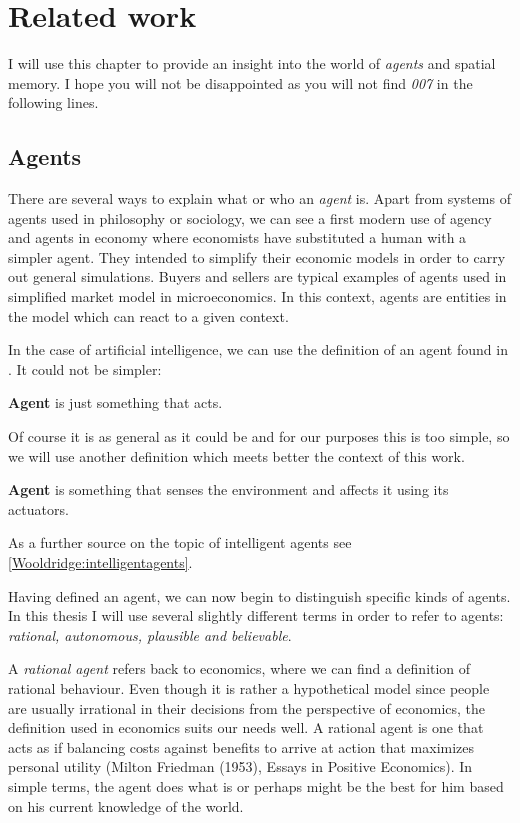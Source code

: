 \chapter{Related work}

I will use this chapter to provide an insight into the world of \emph{agents} and spatial memory. I hope you will not be disappointed as you will not find \textit{007} in the following lines.

\section{Agents}

There are several ways to explain what or who an \emph{agent} is. Apart from systems of agents used in philosophy or sociology, we can see a first modern use of agency and agents in economy where economists have substituted a human with a simpler agent. They intended to simplify their economic models in order to carry out general simulations. Buyers and sellers are typical examples of agents used in simplified market model in microeconomics. In this context, agents are entities in the model which can react to a given context.

In the case of artificial intelligence, we can use the definition of an agent found in \cite{russel2003ai}. It could not be simpler:

\begin{definition}{\bf Agent} is just something that acts.
\end{definition} 

Of course it is as general as it could be and for our purposes this is too simple, so we will use another definition which meets better the context of this work.

\begin{definition}{\bf Agent} is something that senses the environment and affects it using its actuators.
\end{definition} 

As a further source on the topic of intelligent agents see \ref{Wooldridge:intelligentagents}.

Having defined an agent, we can now begin to distinguish specific kinds of agents. In this thesis I will use several slightly different terms in order to refer to agents: \emph{rational, autonomous, plausible and believable}. 

A \emph{rational agent} refers back to economics, where we can find a definition of rational behaviour. Even though it is rather a hypothetical model since people are usually irrational in their decisions from the perspective of economics, the definition used in economics suits our needs well. A rational agent is one that acts as if balancing costs against benefits to arrive at action that maximizes personal utility (Milton Friedman (1953), Essays in Positive Economics). In simple terms, the agent does what is or perhaps might be the best for him based on his current knowledge of the world.
 
